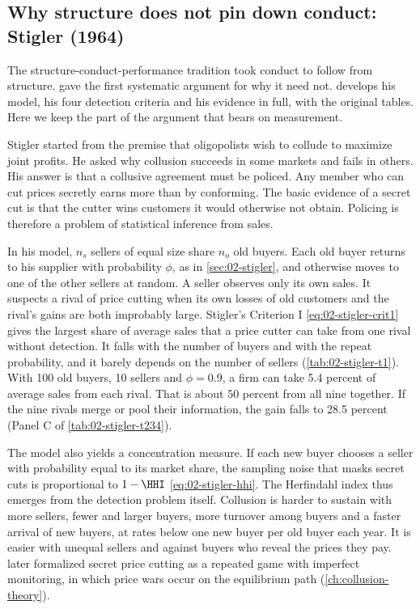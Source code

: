 \subsection{Why structure does not pin down conduct: Stigler (1964)}\label{sec:03-stigler}

The structure-conduct-performance tradition took conduct to follow from structure. \citet{Stigler1964} gave the first
systematic argument for why it need not.  develops his model, his four detection criteria and his
evidence in full, with the original tables. Here we keep the part of the argument that bears on measurement.

Stigler started from the premise that oligopolists wish to collude to maximize joint profits. He asked why collusion
succeeds in some markets and fails in others. His answer is that a collusive agreement must be policed. Any member who
can cut prices secretly earns more than by conforming. The basic evidence of a secret cut is that the cutter wins
customers it would otherwise not obtain. Policing is therefore a problem of statistical inference from sales.

In his model, $n_s$ sellers of equal size share $n_o$ old buyers. Each old buyer returns to his supplier with
probability $\phi$, as in \cref{sec:02-stigler}, and otherwise moves to one of the other sellers at random. A seller
observes only its own sales. It suspects a rival of price cutting when its own losses of old customers and the rival's
gains are both improbably large. Stigler's Criterion I \eqref{eq:02-stigler-crit1} gives the largest share of average
sales that a price cutter can take from one rival without detection. It falls with the number of buyers and with the
repeat probability, and it barely depends on the number of sellers (\cref{tab:02-stigler-t1}). With 100 old buyers, 10
sellers and $\phi = 0.9$, a firm can take 5.4 percent of average sales from each rival. That is about 50 percent from all
nine together. If the nine rivals merge or pool their information, the gain falls to 28.5 percent (Panel C of
\cref{tab:02-stigler-t234}).

The model also yields a concentration measure. If each new buyer chooses a seller with probability equal to its market
share, the sampling noise that masks secret cuts is proportional to $1 - \HHI$ \eqref{eq:02-stigler-hhi}. The Herfindahl
index thus emerges from the detection problem itself. Collusion is harder to sustain with more sellers, fewer and larger
buyers, more turnover among buyers and a faster arrival of new buyers, at rates below one new buyer per old buyer each
year. It is easier with unequal sellers and against buyers who reveal
the prices they pay. \citet{GreenPorter1984} later formalized secret price cutting as a repeated game with imperfect
monitoring, in which price wars occur on the equilibrium path (\cref{ch:collusion-theory}).

